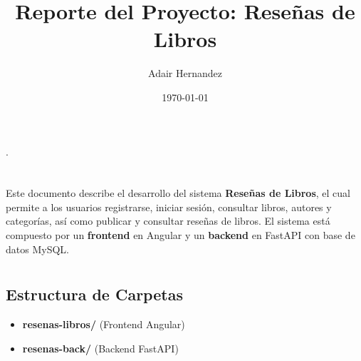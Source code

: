 \documentclass[10pt,a4paper]{article}
\title{\Huge\bfseries Reporte del Proyecto: Reseñas de Libros}
\author{Adair Hernandez}
\date{\today}
\begin{document}
\begin{titlepage}
    \centering
    {\huge \bfseries \color{colorIPN}{Instituto Politécnico Nacional} \par}
    {\Large \bfseries  \color{colorESCOM}{Escuela Superior de Cómputo} \par }
    \vspace{1cm}
    {\huge\Large \color{colorIPN}{Reporte de Proyecto Web: Reseñas de Libros}.\par}
    \vspace{1.5cm}
    {\huge\Large  \color{colorESCOM}{Frontend (Angular) y Backend (FastAPI)}\par}
    \vspace{2cm}
    {\Large\itshape \color{colorIPN}{Alumno: Adair Hernandez}\par} \hfill \break
    {\Large\itshape \color{colorIPN}{\today}\par}
    \vfill
\end{titlepage}

\tableofcontents
\pagebreak

\section{\color{colorIPN}{Introducción}}
Este documento describe el desarrollo del sistema \textbf{Reseñas de Libros}, el cual permite a los usuarios registrarse, iniciar sesión, consultar libros, autores y categorías, así como publicar y consultar reseñas de libros. El sistema está compuesto por un \textbf{frontend} en Angular y un \textbf{backend} en FastAPI con base de datos MySQL.

\section{\color{colorIPN}{Estructura del Proyecto}}

\subsection{Estructura de Carpetas}
\begin{itemize}
    \item \textbf{resenas-libros/} (Frontend Angular)
    \item \textbf{resenas-back/} (Backend FastAPI)
\end{itemize}
\end{document}
